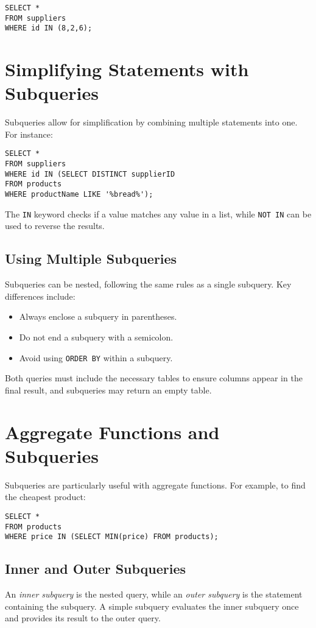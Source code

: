 \documentclass{article}
\begin{document}
\begin{verbatim}
SELECT * 
FROM suppliers
WHERE id IN (8,2,6);
\end{verbatim}

\section{Simplifying Statements with Subqueries}
Subqueries allow for simplification by combining multiple statements into one. For instance:

\begin{verbatim}
SELECT * 
FROM suppliers
WHERE id IN (SELECT DISTINCT supplierID
FROM products
WHERE productName LIKE '%bread%');
\end{verbatim}

The \texttt{IN} keyword checks if a value matches any value in a list, while \texttt{NOT IN} can be used to reverse the results.

\subsection{Using Multiple Subqueries}
Subqueries can be nested, following the same rules as a single subquery. Key differences include:
\begin{itemize}
    \item Always enclose a subquery in parentheses.
    \item Do not end a subquery with a semicolon.
    \item Avoid using \texttt{ORDER BY} within a subquery.
\end{itemize}

Both queries must include the necessary tables to ensure columns appear in the final result, and subqueries may return an empty table.

\section{Aggregate Functions and Subqueries}
Subqueries are particularly useful with aggregate functions. For example, to find the cheapest product:

\begin{verbatim}
SELECT * 
FROM products
WHERE price IN (SELECT MIN(price) FROM products);
\end{verbatim}

\subsection{Inner and Outer Subqueries}
An \textit{inner subquery} is the nested query, while an \textit{outer subquery} is the statement containing the subquery. A simple subquery evaluates the inner subquery once and provides its result to the outer query.
\end{document}

